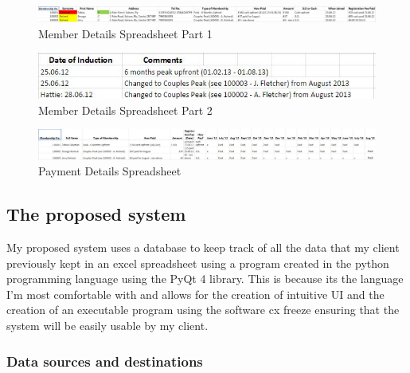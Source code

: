 \begin{figure}[H]
    \includegraphics[width=\textwidth]{Member Spreadsheet 1.JPG}
    \caption{Member Details Spreadsheet Part 1} \label{fig:Member Details Spreadsheet Part 1}
\end{figure}

\begin{figure}[H]
    \includegraphics[width=\textwidth]{Member Spreadsheet 2.JPG}
    \caption{Member Details Spreadsheet Part 2} \label{fig:Member Details Spreadsheet Part 2}
\end{figure}

\begin{figure}[H]
    \includegraphics[width=\textwidth]{Payment Spreadsheet.JPG}
    \caption{Payment Details Spreadsheet } \label{fig:Payment Details Spreadsheet }
\end{figure}

\subsection{The proposed system}

My proposed system uses a database to keep track of all the data that my client previously kept in an excel spreadsheet using a program created in the python programming language using the PyQt 4 library. This is because its the language I'm most comfortable with and allows for the creation of intuitive UI and the creation of an executable program using the software cx freeze ensuring that the system will be easily usable by my client.

\subsubsection{Data sources and destinations}

